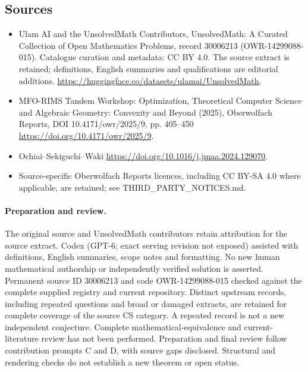 \documentclass[11pt]{article}
\begin{document}
\subsection{Sources}
\begin{itemize}
\item[\hypertarget{source:30006213:1}{S1}] Ulam AI and the UnsolvedMath Contributors, UnsolvedMath: A Curated Collection of Open Mathematics Problems, record 30006213 (OWR-14299088-015). Catalogue curation and metadata: CC BY 4.0. The source extract is retained; definitions, English summaries and qualifications are editorial additions.
\url{https://huggingface.co/datasets/ulamai/UnsolvedMath}.
\item[\hypertarget{source:30006213:2}{S2}] MFO-RIMS Tandem Workshop: Optimization, Theoretical Computer Science and Algebraic Geometry: Convexity and Beyond (2025), Oberwolfach Reports, DOI 10.4171/owr/2025/9, pp. 405--450
\url{https://doi.org/10.4171/owr/2025/9}.
\item[\hypertarget{source:30006213:3}{S3}] Ochiai--Sekiguchi--Waki
\url{https://doi.org/10.1016/j.jmaa.2024.129070}.
\item Source-specific Oberwolfach Reports licences, including CC BY-SA 4.0 where applicable, are retained; see THIRD\_PARTY\_NOTICES.md.
\end{itemize}
\paragraph{Preparation and review.}
The original source and UnsolvedMath contributors retain attribution for the source extract. Codex (GPT-6; exact serving revision not exposed) assisted with definitions, English summaries, scope notes and formatting. No new human mathematical authorship or independently verified solution is asserted. Permanent source ID 30006213 and code OWR-14299088-015 checked against the complete supplied registry and current repository. Distinct upstream records, including repeated questions and broad or damaged extracts, are retained for complete coverage of the source CS category. A repeated record is not a new independent conjecture. Complete mathematical-equivalence and current-literature review has not been performed. Preparation and final review follow contribution prompts C and D, with source gaps disclosed. Structural and rendering checks do not establish a new theorem or open status.
\label{end:30006213}
\end{document}
